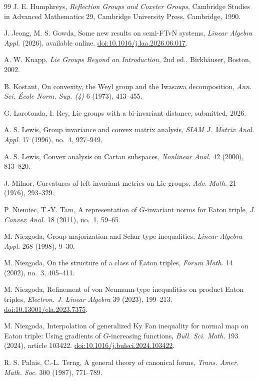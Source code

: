 \documentclass[11pt]{amsart}
\theoremstyle{plain}
\theoremstyle{definition}
\theoremstyle{remark}
\begin{document}
\begin{thebibliography}{99}
 J. E. Humphreys, \emph{Reflection Groups and Coxeter Groups}, Cambridge Studies in Advanced Mathematics 29, Cambridge University Press, Cambridge, 1990.

 J. Jeong, M. S. Gowda, Some new results on semi-FTvN systems, \emph{Linear Algebra Appl.} (2026), available online. \href{https://doi.org/10.1016/j.laa.2026.06.017}{doi:10.1016/j.laa.2026.06.017}.

 A. W. Knapp, \emph{Lie Groups Beyond an Introduction}, 2nd ed., Birkh\"auser, Boston, 2002.

 B. Kostant, On convexity, the Weyl group and the Iwasawa decomposition, \emph{Ann. Sci. \'Ecole Norm. Sup. (4)} 6 (1973), 413--455.

 G. Larotonda, I. Rey, Lie groups with a bi-invariant distance, submitted, 2026.


 A. S. Lewis, Group invariance and convex matrix analysis, \emph{SIAM J. Matrix Anal. Appl.} 17 (1996), no.~4, 927--949.

 A. S. Lewis, Convex analysis on Cartan subspaces, \emph{Nonlinear Anal.} 42 (2000), 813--820.

 J. Milnor, Curvatures of left invariant metrics on Lie groups, \emph{Adv. Math.} 21 (1976), 293--329.

 P. Niemiec, T.-Y. Tam, A representation of $G$-invariant norms for Eaton triple, \emph{J. Convex Anal.} 18 (2011), no.~1, 59--65.

 M. Niezgoda, Group majorization and Schur type inequalities, \emph{Linear Algebra Appl.} 268 (1998), 9--30.

 M. Niezgoda, On the structure of a class of Eaton triples, \emph{Forum Math.} 14 (2002), no.~3, 405--411.

 M. Niezgoda, Refinement of von Neumann-type inequalities on product Eaton triples, \emph{Electron. J. Linear Algebra} 39 (2023), 199--213. \href{https://doi.org/10.13001/ela.2023.7375}{doi:10.13001/ela.2023.7375}.

 M. Niezgoda, Interpolation of generalized Ky Fan inequality for normal map on Eaton triple: Using gradients of $G$-increasing functions, \emph{Bull. Sci. Math.} 193 (2024), article 103422. \href{https://doi.org/10.1016/j.bulsci.2024.103422}{doi:10.1016/j.bulsci.2024.103422}.

 R. S. Palais, C.-L. Terng, A general theory of canonical forms, \emph{Trans. Amer. Math. Soc.} 300 (1987), 771--789.


\end{thebibliography}
\end{document}
